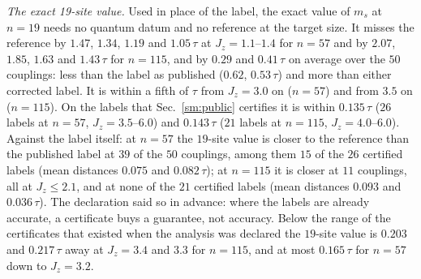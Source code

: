 \documentclass[aps,prx,onecolumn,10pt,nofootinbib,longbibliography,floatfix]{revtex4-2}
\theoremstyle{remark}
\newcommand{\Jz}{J_z}
\newcommand{\ms}{m_s}
\begin{document}
\emph{The exact 19-site value.} Used in place of the label, the exact value of $\ms$ at $n=19$ needs no quantum
datum and no reference at the target size. It misses the reference by $1.47$, $1.34$, $1.19$ and $1.05\,\tau$ at %
$\Jz=1.1$--$1.4$ for $n=57$ and by $2.07$, $1.85$, $1.63$ and $1.43\,\tau$ for $n=115$, and by $0.29$ and %
$0.41\,\tau$ on average over the $50$ couplings: less than the label as published ($0.62$, $0.53\,\tau$) and more %
than either corrected label. It is within a fifth of $\tau$ from $\Jz=3.0$ on ($n=57$) and from $3.5$ on ($n=115$). %
On the labels that Sec.~\ref{sm:public} certifies it is within $0.135\,\tau$ ($26$ labels at $n=57$, %
$\Jz=3.5$--$6.0$) and $0.143\,\tau$ ($21$ labels at $n=115$, $\Jz=4.0$--$6.0$). Against the label itself: at %
$n=57$ the $19$-site value is closer to the reference than the published label at $39$ of the $50$ couplings, %
among them $15$ of the $26$ certified labels (mean distances $0.075$ and $0.082\,\tau$); at $n=115$ it is closer at %
$11$ couplings, all at $\Jz\le2.1$, and at none of the $21$ certified labels (mean distances $0.093$ and %
$0.036\,\tau$). The declaration said so in advance: where the labels are already accurate, a certificate buys a %
guarantee, not accuracy. Below the range of the certificates that existed when the analysis was declared the
$19$-site value is $0.203$ and $0.217\,\tau$ away at $\Jz=3.4$ and $3.3$ for $n=115$, and at most $0.165\,\tau$ %
for $n=57$ down to $\Jz=3.2$.
\end{document}
